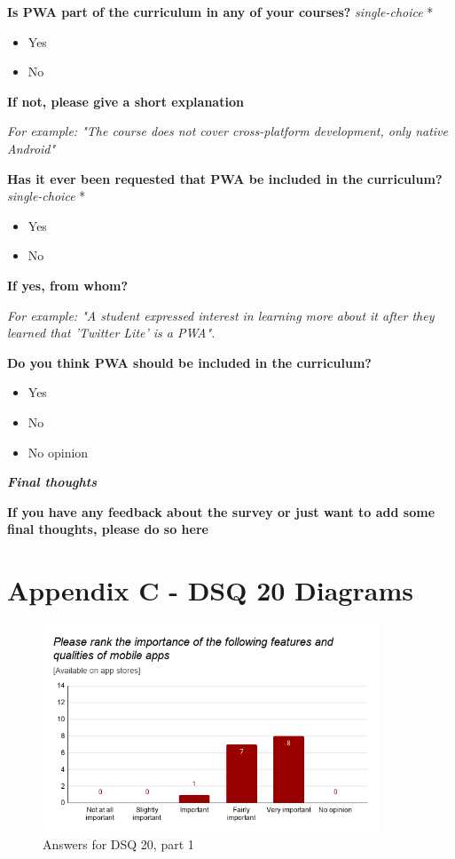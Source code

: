 \documentclass[a4paper,12pt]{article}
\begin{document}
\textbf{Is PWA part of the curriculum in any of your courses?} \textit{single-choice} *
\begin{itemize}
    \item Yes
    \item No
\end{itemize}

\textbf{If not, please give a short explanation}

\textit{For example: "The course does not cover cross-platform development, only native Android"}

\quad

\textbf{Has it ever been requested that PWA be included in the curriculum?} \textit{single-choice} *
\begin{itemize}
    \item Yes
    \item No
\end{itemize}

\textbf{If yes, from whom?}

\textit{For example: "A student expressed interest in learning more about it after they learned that 'Twitter Lite' is a PWA".}

\quad

\textbf{Do you think PWA should be included in the curriculum?}
\begin{itemize}
    \item Yes
    \item No
    \item No opinion
\end{itemize}

\quad

\quad 

\textbf{\textit{Final thoughts}}

\textbf{If you have any feedback about the survey or just want to add some final thoughts, please do so here}

\newpage
\section{Appendix C - DSQ 20 Diagrams}
\label{Appendix_devMultiDiagrams}

\begin{figure}[ht!]
    \centering
    \includegraphics[width=10cm]{img/Results/dsq20_1.png}
    \caption{Answers for DSQ 20, part 1}
    \label{fig:res_devq20_1}
\end{figure}
\end{document}
